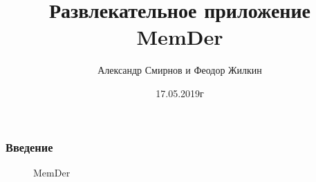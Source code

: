 \documentclass[xetex,mathserif,serif, xcolor=table]{beamer}
\title{Развлекательное приложение MemDer}
\author{Александр Смирнов и Феодор Жилкин}
\date{17.05.2019г}
\begin{document}
	\frame{\titlepage}

	\begin{frame}
		\frametitle{Введение}
		\begin{figure}[h]
            \caption{MemDer}
            \label{fig:image}
        \end{figure}
	\end{frame}
	
\end{document}

